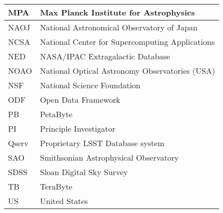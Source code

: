 \begin{longtable}{|l|p{}|}
MPA & Max Planck Institute for Astrophysics \\\hline
NAOJ & National Astronomical Observatory of Japan \\\hline
NCSA & National Center for Supercomputing Applications \\\hline
NED & NASA/IPAC Extragalactic Database \\\hline
NOAO & National Optical Astronomy Observatories (USA) \\\hline
NSF & National Science Foundation \\\hline
ODF & Open Data Framework \\\hline
PB & PetaByte \\\hline
PI & Principle Investigator \\\hline
Qserv & Proprietary LSST Database system \\\hline
SAO & Smithsonian Astrophysical Observatory \\\hline
SDSS & Sloan Digital Sky Survey \\\hline
TB & TeraByte \\\hline
US & United States \\\hline
\end{longtable}
